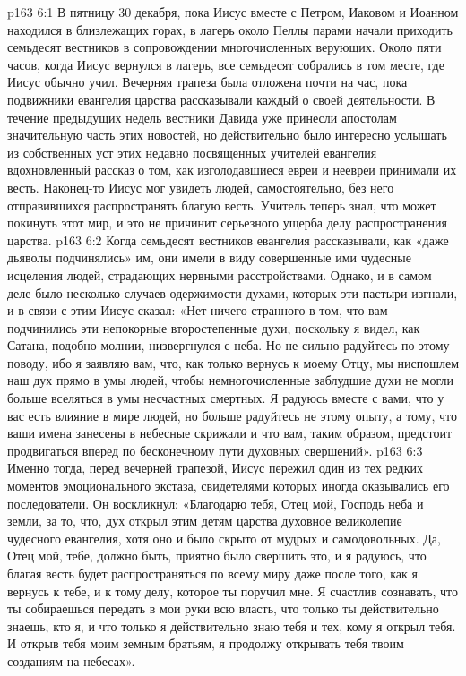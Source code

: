 \vs p163 6:1 В пятницу 30 декабря, пока Иисус вместе с Петром, Иаковом и Иоанном находился в близлежащих горах, в лагерь около Пеллы парами начали приходить семьдесят вестников в сопровождении многочисленных верующих. Около пяти часов, когда Иисус вернулся в лагерь, все семьдесят собрались в том месте, где Иисус обычно учил. Вечерняя трапеза была отложена почти на час, пока подвижники евангелия царства рассказывали каждый о своей деятельности. В течение предыдущих недель вестники Давида уже принесли апостолам значительную часть этих новостей, но действительно было интересно услышать из собственных уст этих недавно посвященных учителей евангелия вдохновленный рассказ о том, как изголодавшиеся евреи и неевреи принимали их весть. Наконец\hyp{}то Иисус мог увидеть людей, самостоятельно, без него отправившихся распространять благую весть. Учитель теперь знал, что может покинуть этот мир, и это не причинит серьезного ущерба делу распространения царства.
\vs p163 6:2 Когда семьдесят вестников евангелия рассказывали, как «даже дьяволы подчинялись» им, они имели в виду совершенные ими чудесные исцеления людей, страдающих нервными расстройствами. Однако, и в самом деле было несколько случаев одержимости духами, которых эти пастыри изгнали, и в связи с этим Иисус сказал: «Нет ничего странного в том, что вам подчинились эти непокорные второстепенные духи, поскольку я видел, как Сатана, подобно молнии, низвергнулся с неба. Но не сильно радуйтесь по этому поводу, ибо я заявляю вам, что, как только вернусь к моему Отцу, мы ниспошлем наш дух прямо в умы людей, чтобы немногочисленные заблудшие духи не могли больше вселяться в умы несчастных смертных. Я радуюсь вместе с вами, что у вас есть влияние в мире людей, но больше радуйтесь не этому опыту, а тому, что ваши имена занесены в небесные скрижали и что вам, таким образом, предстоит продвигаться вперед по бесконечному пути духовных свершений».
\vs p163 6:3 Именно тогда, перед вечерней трапезой, Иисус пережил один из тех редких моментов эмоционального экстаза, свидетелями которых иногда оказывались его последователи. Он воскликнул: «Благодарю тебя, Отец мой, Господь неба и земли, за то, что, дух открыл этим детям царства духовное великолепие чудесного евангелия, хотя оно и было скрыто от мудрых и самодовольных. Да, Отец мой, тебе, должно быть, приятно было свершить это, и я радуюсь, что благая весть будет распространяться по всему миру даже после того, как я вернусь к тебе, и к тому делу, которое ты поручил мне. Я счастлив сознавать, что ты собираешься передать в мои руки всю власть, что только ты действительно знаешь, кто я, и что только я действительно знаю тебя и тех, кому я открыл тебя. И открыв тебя моим земным братьям, я продолжу открывать тебя твоим созданиям на небесах».
